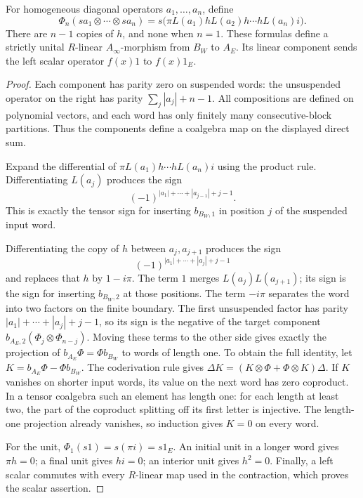 \begin{theorem}
\label{thm:da-all-arity}
For homogeneous diagonal operators \(a_1,\ldots,a_n\), define
\begin{equation}
 \Phi_n(sa_1\otimes\cdots\otimes sa_n)
   =s\bigl(\pi L(a_1)hL(a_2)h\cdots hL(a_n)i\bigr).
 \label{eq:da-operator-components}
\end{equation}
There are \(n-1\) copies of \(h\), and none when \(n=1\).
These formulas define a strictly unital \(R\)-linear
\(A_\infty\)-morphism from \(B_W\) to \(A_E\).
Its linear component sends the left scalar operator \(f(x)1\)
to \(f(x)1_E\).
\end{theorem}
\begin{proof}
Each component has parity zero on suspended words: the
unsuspended operator on the right has parity
\(\sum_j|a_j|+n-1\).
All compositions are defined on polynomial vectors, and each
word has only finitely many consecutive-block partitions.
Thus the components define a coalgebra map on the displayed
direct sum.

Expand the differential of
\(\pi L(a_1)h\cdots hL(a_n)i\) using the product rule.
Differentiating \(L(a_j)\) produces the sign
\[
 (-1)^{|a_1|+\cdots+|a_{j-1}|+j-1}.
\]
This is exactly the tensor sign for inserting \(b_{B_W,1}\)
in position \(j\) of the suspended input word.

Differentiating the copy of \(h\) between \(a_j,a_{j+1}\)
produces the sign
\[
 (-1)^{|a_1|+\cdots+|a_j|+j-1}
\]
and replaces that \(h\) by \(1-i\pi\).
The term \(1\) merges \(L(a_j)L(a_{j+1})\); its sign is the
sign for inserting \(b_{B_W,2}\) at those positions.
The term \(-i\pi\) separates the word into two factors on the
finite boundary. The first unsuspended factor has parity
\(|a_1|+\cdots+|a_j|+j-1\), so its sign is the negative of
the target component \(b_{A_E,2}(\Phi_j\otimes\Phi_{n-j})\).
Moving these terms to the other side gives exactly the
projection of \(b_{A_E}\Phi=\Phi b_{B_W}\) to words of length one.
To obtain the full identity, let
\(K=b_{A_E}\Phi-\Phi b_{B_W}\).
The coderivation rule gives
\(\Delta K=(K\otimes\Phi+\Phi\otimes K)\Delta\).
If \(K\) vanishes on shorter input words, its value on the next
word has zero coproduct. In a tensor coalgebra such an element
has length one: for each length at least two, the part of the
coproduct splitting off its first letter is injective.
The length-one projection already vanishes, so induction gives
\(K=0\) on every word.

For the unit, \(\Phi_1(s1)=s(\pi i)=s1_E\).
An initial unit in a longer word gives \(\pi h=0\);
a final unit gives \(hi=0\); an interior unit gives \(h^2=0\).
Finally, a left scalar commutes with every \(R\)-linear map
used in the contraction, which proves the scalar assertion.
\end{proof}

